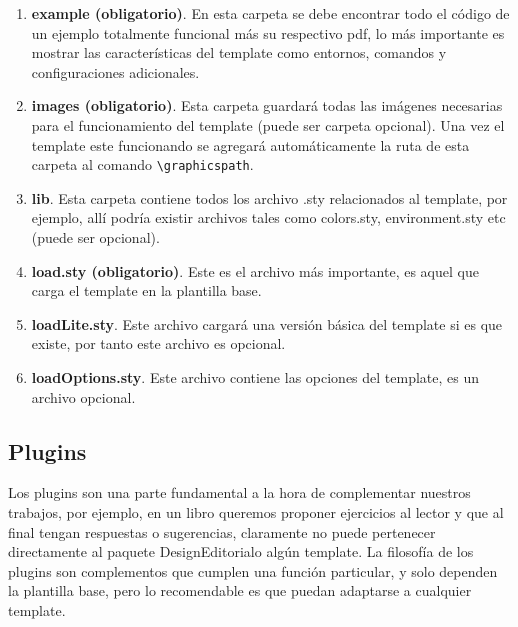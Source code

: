 {\begin{enumerate}
		\item \textbf{example (obligatorio)}. En esta carpeta se debe encontrar todo el código de un ejemplo totalmente funcional más su respectivo pdf, lo más importante es mostrar las características del template como entornos, comandos y configuraciones adicionales. 
		\item \textbf{images (obligatorio)}. Esta carpeta guardará todas las imágenes necesarias para el funcionamiento del template (puede ser carpeta opcional). Una vez el template este funcionando se agregará automáticamente la ruta de esta carpeta al comando \verb|\graphicspath|.
		\item \textbf{lib}. Esta carpeta contiene todos los archivo .sty relacionados al template, por ejemplo, allí podría existir archivos tales como colors.sty, environment.sty etc (puede ser opcional).
		\item \textbf{load.sty (obligatorio)}. Este es el archivo más importante, es aquel que carga el template en la plantilla base.
		\item \textbf{loadLite.sty}. Este archivo cargará una versión básica del template si es que existe, por tanto este archivo es opcional.
		\item \textbf{loadOptions.sty}. Este archivo contiene las opciones del template, es un archivo opcional.
	\end{enumerate}
	\subsection{Plugins}
	Los plugins son una parte fundamental a la hora de complementar nuestros trabajos, por ejemplo, en un libro queremos proponer ejercicios al lector y que al final tengan respuestas o sugerencias, claramente no puede pertenecer directamente al paquete DesignEditorial\printversion\space o algún template. \pap La filosofía de los plugins son complementos que cumplen una función particular, y solo dependen la plantilla base, pero lo recomendable es que puedan adaptarse a cualquier template.
}
